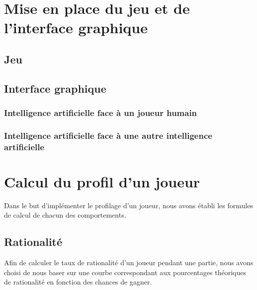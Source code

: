 \documentclass{report}
\begin{document}
\chapter{Mise en place du jeu et de l'interface graphique}
\section{Jeu}
\section{Interface graphique}
\subsection{Intelligence artificielle face à un joueur humain}
\subsection{Intelligence artificielle face à une autre intelligence artificielle}

\chapter{Calcul du profil d'un joueur}


\hspace{0.5cm}Dans le but d'implémenter le profilage d'un joueur, nous avons établi les formules de calcul de chacun des comportements. \par

\section{Rationalité}

\hspace{0.5cm}Afin de calculer le taux de rationalité d'un joueur pendant une partie, nous avons choisi de nous baser sur une courbe correspondant aux pourcentages théoriques de rationalité en fonction des chances de gagner. 
\end{document}
